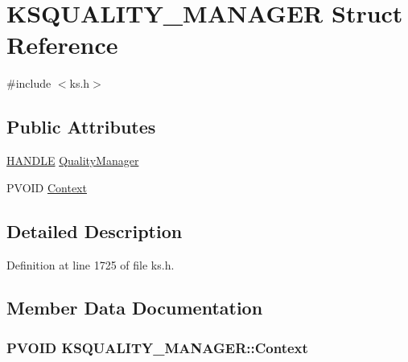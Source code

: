 \hypertarget{struct_k_s_q_u_a_l_i_t_y___m_a_n_a_g_e_r}{}\section{K\+S\+Q\+U\+A\+L\+I\+T\+Y\+\_\+\+M\+A\+N\+A\+G\+ER Struct Reference}
\label{struct_k_s_q_u_a_l_i_t_y___m_a_n_a_g_e_r}


{\ttfamily \#include $<$ks.\+h$>$}

\subsection*{Public Attributes}
\begin{DoxyCompactItemize}
\item 
\hyperlink{_sound_touch_d_l_l_8h_aa8c0374618b33785ccb02f74bcfebc46}{H\+A\+N\+D\+LE} \hyperlink{struct_k_s_q_u_a_l_i_t_y___m_a_n_a_g_e_r_a651005190b4905523baf47adeacd4c13}{Quality\+Manager}
\item 
P\+V\+O\+ID \hyperlink{struct_k_s_q_u_a_l_i_t_y___m_a_n_a_g_e_r_a1377768fb623f9f7d60741356e765ff1}{Context}
\end{DoxyCompactItemize}


\subsection{Detailed Description}


Definition at line 1725 of file ks.\+h.



\subsection{Member Data Documentation}
\subsubsection[{\texorpdfstring{Context}{Context}}]{\setlength{\rightskip}{0pt plus 5cm}P\+V\+O\+ID K\+S\+Q\+U\+A\+L\+I\+T\+Y\+\_\+\+M\+A\+N\+A\+G\+E\+R\+::\+Context}\hypertarget{struct_k_s_q_u_a_l_i_t_y___m_a_n_a_g_e_r_a1377768fb623f9f7d60741356e765ff1}{}\label{struct_k_s_q_u_a_l_i_t_y___m_a_n_a_g_e_r_a1377768fb623f9f7d60741356e765ff1}


